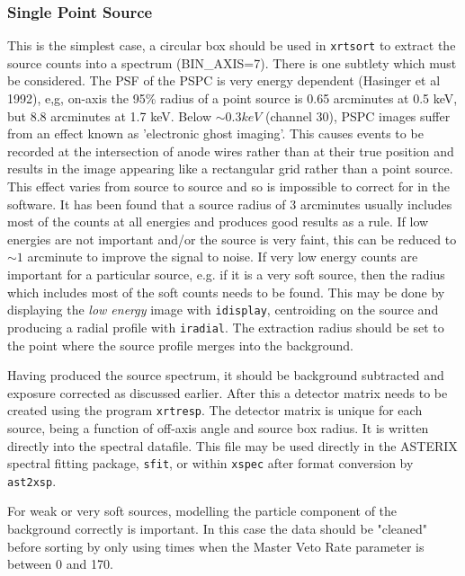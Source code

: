 \documentclass[11pt,fleqn]{article}    %
\begin{document}
\subsubsection{Single Point Source}
This is the simplest case, a circular box should be used in {\tt xrtsort} to
extract the source counts into a spectrum (BIN\_AXIS=7). There is one 
subtlety which must be 
considered. The PSF of the PSPC is very energy dependent (Hasinger et al 1992),
e,g, on-axis the 95\% radius of a point source is 0.65 arcminutes at 
0.5 keV, but 8.8 arcminutes at 1.7 keV. Below $\sim 0.3 keV$ (channel 30),
PSPC images suffer from an effect known as 'electronic ghost imaging'.
This causes events to be recorded at the intersection of anode wires rather
than at their true position and results in the image appearing like a
rectangular grid rather than a point source. This effect varies
from source to source and so is impossible to correct for in the software.
It has been found that a source radius of 3 arcminutes usually includes
most of the counts at all energies and produces good results as a rule.
If low energies are not important and/or the source is very faint, this
can be reduced to $\sim 1$ arcminute to improve the signal to noise.
If very low energy counts are important for a particular source, e.g.
if it is a very soft source, then the radius which includes most of the soft
counts needs to be found. This may be done by displaying the {\em low energy}
image with {\tt idisplay}, centroiding on the source and producing a radial
profile with {\tt iradial}. The extraction radius should be set to the point
where the source profile merges into the background.

Having produced the source spectrum, it should be background subtracted
and exposure corrected as discussed earlier. After this a detector matrix
needs to be created using the program {\tt xrtresp}. The detector matrix is
unique for each source, being a function of off-axis angle and source
box radius. It is written directly into the spectral datafile. This file
may be used directly in the ASTERIX spectral fitting package, {\tt sfit}, or
within {\tt xspec} after format conversion by {\tt ast2xsp}.

For weak or very soft sources, modelling the particle component of the
background correctly is important. In this case the data should be
"cleaned" before sorting by only using times when the Master Veto Rate
parameter is between 0 and 170. 
\end{document}
